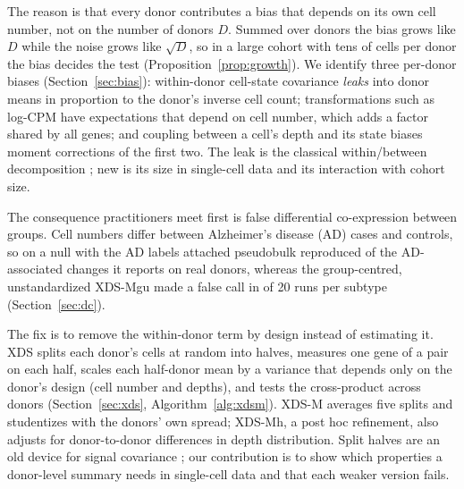 \documentclass[10pt,letterpaper]{article}
\theoremstyle{definition}
\theoremstyle{remark}
\begin{document}
The reason is that every donor contributes a bias that depends on its own cell number, not on the number of donors $D$. Summed over donors the bias grows like $D$ while the noise grows like $\sqrt D$, so in a large cohort with tens of cells per donor the bias decides the test (Proposition~\ref{prop:growth}). We identify three per-donor biases (Section~\ref{sec:bias}): within-donor cell-state covariance \emph{leaks} into donor means in proportion to the donor's inverse cell count; transformations such as log-CPM have expectations that depend on cell number, which adds a factor shared by all genes; and coupling between a cell's depth and its state biases moment corrections of the first two. The leak is the classical within/between decomposition \citep{Spearman1904,Fuller1987}; new is its size in single-cell data and its interaction with cohort size.

The consequence practitioners meet first is false differential co-expression between groups. Cell numbers differ between Alzheimer's disease (AD) cases and controls, so on a null with the AD labels attached pseudobulk reproduced \DCshare{} of the AD-associated changes it reports on real donors, whereas the group-centred, unstandardized XDS-Mgu made a false call in \RfDCgu{} of 20 runs per subtype (Section~\ref{sec:dc}).

The fix is to remove the within-donor term by design instead of estimating it. XDS splits each donor's cells at random into halves, measures one gene of a pair on each half, scales each half-donor mean by a variance that depends only on the donor's design (cell number and depths), and tests the cross-product across donors (Section~\ref{sec:xds}, Algorithm~\ref{alg:xdsm}). XDS-M averages five splits and studentizes with the donors' own spread; XDS-Mh, a post hoc refinement, also adjusts for donor-to-donor differences in depth distribution. Split halves are an old device for signal covariance \citep{Schoppe2016,Stringer2019}; our contribution is to show which properties a donor-level summary needs in single-cell data and that each weaker version fails.
\end{document}
